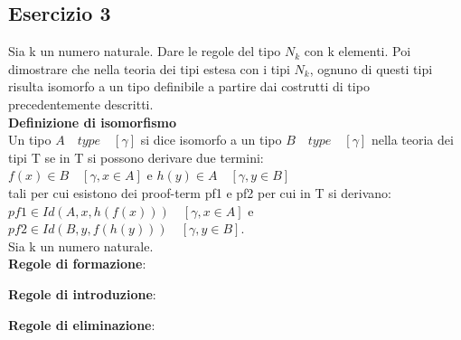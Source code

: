 \subsection{Esercizio 3}

Sia k un numero naturale. Dare le regole del tipo $N_k$ con k elementi.
Poi dimostrare che nella teoria dei tipi estesa con i tipi $N_k$, ognuno di
questi tipi risulta isomorfo a un tipo definibile a partire dai costrutti di
tipo precedentemente descritti. \\

\textbf{Definizione di isomorfismo} \\

Un tipo $A \quad type \quad [\gamma]$ si dice isomorfo a un tipo $B \quad type \quad [\gamma]$
nella teoria dei tipi T se in T si possono derivare due termini: \\

$f(x) \in B \quad [\gamma, x \in A]$ e $h(y) \in A \quad [\gamma, y \in B]$ \\

tali per cui esistono dei proof-term pf1 e pf2 per cui in T si derivano: \\

$pf1 \in Id(A, x, h(f(x))) \quad [\gamma, x \in A]$ e
$pf2 \in Id(B, y, f(h(y))) \quad [\gamma, y \in B]$. \\

Sia k un numero naturale. \\

\textbf{Regole di formazione}: \\

\begin{prooftree}
\end{prooftree}

\textbf{Regole di introduzione}: \\

\begin{prooftree}
\end{prooftree}

\begin{prooftree}
\end{prooftree}

\textbf{Regole di eliminazione}: \\

\begin{prooftree}
\end{prooftree}

